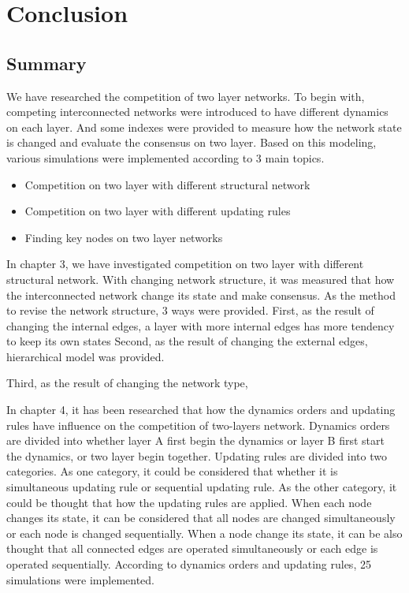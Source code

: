 
\chapter{Conclusion}
\label{chap:conclusion}
\section{Summary}
We have researched the competition of two layer networks. To begin with, competing interconnected networks were introduced to have different dynamics on each layer. And some indexes were provided to measure how the network state is changed and evaluate the consensus on two layer. Based on this modeling, various simulations were implemented according to 3 main topics.
\begin{itemize}
\item Competition on two layer with different structural network
\item Competition on two layer with different updating rules
\item Finding key nodes on two layer networks
\end{itemize}

In chapter 3, we have investigated competition on two layer with different structural network. With changing network structure, it was measured that how the interconnected network change its state and make consensus. As the method to revise the network structure, 3 ways were provided. First, as the result of changing the internal edges, a layer with more internal edges has more tendency to keep its own states
Second, as the result of changing the external edges, hierarchical model was provided. 

Third, as the result of changing the network type,  




In chapter 4, it has been researched that how the dynamics orders and updating rules have influence on the competition of two-layers network. Dynamics orders are divided into whether layer A first begin the dynamics or layer B first start the dynamics, or two layer begin together. Updating rules are divided into two categories. As one category, it could be considered that whether it is simultaneous updating rule or sequential updating rule. As the other category, it could be thought that how the updating rules are applied. When each node changes its state, it can be considered that all nodes are changed simultaneously or each node is changed sequentially. When a node change its state, it can be also thought that all connected edges are operated simultaneously or each edge is operated sequentially. 
According to dynamics orders and updating rules, 25 simulations were implemented.   

